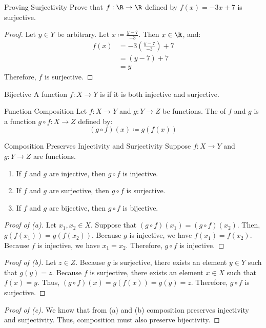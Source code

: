 \documentclass[12pt]{report}
\begin{document}
\begin{exbox}{Proving Surjectivity}{}
    Prove that $f : \R \to \R$ defined by $f(x) = -3x+7$ is surjective.
    \tcblower
    \begin{proof}
        Let $y \in Y$ be arbitrary. Let $x \coloneq \frac{y-7}{-3}$. Then $x \in \R$, and:
        \begin{align*}
            f(x)
            &= -3 \left( \frac{y-7}{-3} \right) + 7 \\
            &= (y-7) + 7 \\
            &= y
        \end{align*}
        Therefore, $f$ is surjective.
    \end{proof}
\end{exbox}

\begin{dfnbox}{Bijective}{}
    A function $f : X \to Y$ is  if it is both injective and surjective.
\end{dfnbox}

\begin{dfnbox}{Function Composition}{}
    Let $f : X \to Y$ and $g : Y \to Z$ be functions. The  of $f$ and $g$ is a function $g \circ f : X \to Z$ defined by:
    \[ (g \circ f) (x) \coloneq g(f(x)) \]
\end{dfnbox}

\begin{thmbox}{Composition Preserves Injectivity and Surjectivity}{}
    Suppose $f : X \to Y$ and $g : Y \to Z$ are functions.
    \begin{enumerate}[label=(\alph*)]
        \item If $f$ and $g$ are injective, then $g \circ f$ is injective.
        \item If $f$ and $g$ are surjective, then $g \circ f$ is surjective.
        \item If $f$ and $g$ are bijective, then $g \circ f$ is bijective.
    \end{enumerate}
    \tcblower
    \begin{proof}[Proof of (a)]
        Let $x_1, x_2 \in X$. Suppose that $(g \circ f)(x_1) = (g \circ f)(x_2)$. Then, $g(f(x_1)) = g(f(x_2))$. Because $g$ is injective, we have $f(x_1) = f(x_2)$. Because $f$ is injective, we have $x_1 = x_2$. Therefore, $g \circ f$ is injective.
    \end{proof}

    \begin{proof}[Proof of (b)]
        Let $z \in Z$. Because $g$ is surjective, there exists an element $y \in Y$ such that $g(y) = z$. Because $f$ is surjective, there exists an element $x \in X$ such that $f(x) = y$. Thus, $(g \circ f)(x) = g(f(x)) = g(y) = z$. Therefore, $g \circ f$ is surjective.
    \end{proof}

    \begin{proof}[Proof of (c)]
        We know that from (a) and (b) composition preserves injectivity and surjectivity. Thus, composition must also preserve bijectivity.
    \end{proof}
\end{thmbox}
\end{document}
